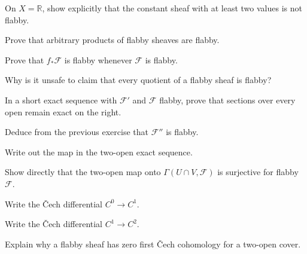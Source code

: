 \begin{exercise}\label{exr:vi46-05}
On $X=\mathbb R$, show explicitly that the constant sheaf with at least two values is not flabby.
\end{exercise}

\begin{exercise}\label{exr:vi46-06}
Prove that arbitrary products of flabby sheaves are flabby.
\end{exercise}

\begin{exercise}\label{exr:vi46-07}
Prove that $f_*\mathcal F$ is flabby whenever $\mathcal F$ is flabby.
\end{exercise}

\begin{exercise}\label{exr:vi46-08}
Why is it unsafe to claim that every quotient of a flabby sheaf is flabby?
\end{exercise}

\begin{exercise}\label{exr:vi46-09}
In a short exact sequence with $\mathcal F'$ and $\mathcal F$ flabby, prove that sections over every open remain exact on the right.
\end{exercise}

\begin{exercise}\label{exr:vi46-10}
Deduce from the previous exercise that $\mathcal F''$ is flabby.
\end{exercise}

\begin{exercise}\label{exr:vi46-11}
Write out the map in the two-open exact sequence.
\end{exercise}

\begin{exercise}\label{exr:vi46-12}
Show directly that the two-open map onto $\Gamma(U\cap V,\mathcal F)$ is surjective for flabby $\mathcal F$.
\end{exercise}

\begin{exercise}\label{exr:vi46-13}
Write the \v{C}ech differential $C^0\to C^1$.
\end{exercise}

\begin{exercise}\label{exr:vi46-14}
Write the \v{C}ech differential $C^1\to C^2$.
\end{exercise}

\begin{exercise}\label{exr:vi46-15}
Explain why a flabby sheaf has zero first \v{C}ech cohomology for a two-open cover.
\end{exercise}

